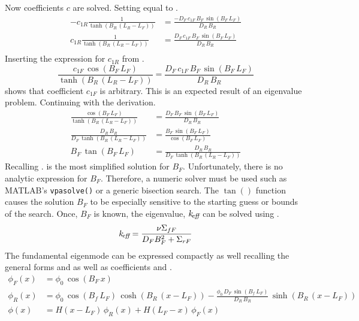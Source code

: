   Now coefficients $c$ are solved. Setting  equal to
  .
  \begin{align}
    -c_{1R} \frac{1}{\tanh(B_R\,(L_R-L_F))}
      &= \frac{-D_F \, c_{1F} \, B_F \, \sin(B_F \, L_F)}{D_R\,B_R} \\
    c_{1R} \frac{1}{\tanh(B_R\,(L_R-L_F))}
      &= \frac{D_F \, c_{1F} \, B_F \, \sin(B_F \, L_F)}{D_R\,B_R} \\
  \end{align}
  Inserting the expression for $c_{1R}$ from .
  \begin{equation}
    \label{eq:2reg_c1f_arbitrary}
    \frac{c_{1F} \, \cos(B_F \, L_F)}{\tanh(B_R \, (L_R-L_F))} =
      \frac{D_F \, c_{1F} \, B_F \, \sin(B_F \, L_F)}{D_R \, B_R}
  \end{equation}
   shows that coefficient $c_{1F}$ is arbitrary.
  This is an expected result of an eigenvalue problem. Continuing with the
  derivation.
  \begin{align}
    \frac{\cos(B_F \, L_F)}{\tanh(B_R \, (L_R-L_F))} &=
      \frac{D_F \, B_F \, \sin(B_F \, L_F)}{D_R \, B_R} \\
    \frac{D_R \, B_R}{D_F \, \tanh(B_R \, (L_R - L_F))} &= 
      \frac{B_F \, \sin(B_F \, L_F)}{\cos(B_F \, L_F)} \\
    \label{eq:2reg_bf}
    B_F \, \tan(B_F \, L_F) &= \frac{D_R \, B_R}{D_F \, \tanh(B_R \, (L_R-L_F))}
  \end{align}
  Recalling . 
   is the most simplified solution for $B_F$. Unfortunately,
  there is no analytic expression for $B_F$. Therefore, a numeric solver must be
  used such as MATLAB's \verb|vpasolve()| or a generic bisection search. The 
  $\tan()$ function causes the solution $B_F$ to be especially sensitive to the
  starting guess or bounds of the search. Once, $B_F$ is known, the eigenvalue, 
  $k_{\!\mbox{\scriptsize \em eff}}$ can be solved using .
  \begin{equation}
    \label{eq:keff2reg}
    k_{\!\mbox{\scriptsize \em eff}} = \frac{\nu \Sigma_{fF}}{D_F B_F^2 + \Sigma_{rF}}
  \end{equation}
  The fundamental eigenmode can be expressed compactly as well recalling the
  general forms  and  as well as
  coefficients  and .
  \begin{align}
    \phi_F(x) &= \phi_0 \, \cos(B_F \, x) \\
    \phi_R(x) &= \phi_0 \, \cos(B_f \, L_F) \, \cosh(B_R \, (x-L_F)) - 
      \frac{\phi_0 \, D_F \, \sin(B_f\,L_F)}{D_R \, B_R} \, 
      \sinh(B_R\,(x-L_F)) \\
    \label{eq:analytic_2reg}
    \phi(x) &= H(x-L_F) \, \phi_R(x) + H(L_F-x) \, \phi_F(x)
  \end{align}
